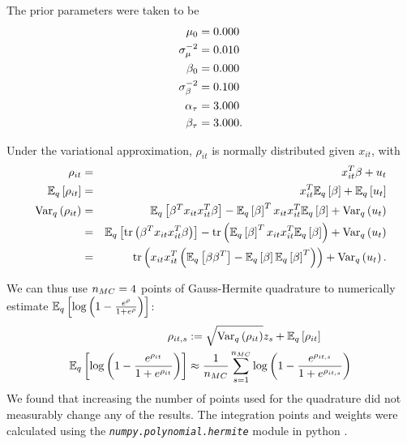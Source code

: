 \documentclass{article}\usepackage[]{graphicx}\usepackage[]{color}
\theoremstyle{plain}
\theoremstyle{definition}
\theoremstyle{plain}
\theoremstyle{plain}
\theoremstyle{plain}
\theoremstyle{plain}
\begin{document}
The prior parameters were taken to be
\begin{align*}
\mu_{0} & =0.000\\
\sigma_{\mu}^{-2} & =0.010\\
\beta_{0} & =0.000\\
\sigma_{\beta}^{-2} & =0.100\\
\alpha_{\tau} & =3.000\\
\beta_{\tau} & =3.000.
\end{align*}

Under the variational approximation, $\rho_{it}$ is normally distributed
given $x_{it}$, with 
\begin{eqnarray*}
\rho_{it} & = & x_{it}^{T}\beta+u_{t}\\
\mathbb{E}_{q}\left[\rho_{it}\right] & = & x_{it}^{T}\mathbb{E}_{q}\left[\beta\right]+\mathbb{E}_{q}\left[u_{t}\right]\\
\textrm{Var}_{q}\left(\rho_{it}\right) & = & \mathbb{E}_{q}\left[\beta^{T}x_{it}x_{it}^{T}\beta\right]-\mathbb{E}_{q}\left[\beta\right]^{T}x_{it}x_{it}^{T}\mathbb{E}_{q}\left[\beta\right]+\textrm{Var}_{q}\left(u_{t}\right)\\
 & = & \mathbb{E}_{q}\left[\textrm{tr}\left(\beta^{T}x_{it}x_{it}^{T}\beta\right)\right]-\textrm{tr}\left(\mathbb{E}_{q}\left[\beta\right]^{T}x_{it}x_{it}^{T}\mathbb{E}_{q}\left[\beta\right]\right)+\textrm{Var}_{q}\left(u_{t}\right)\\
 & = & \textrm{tr}\left(x_{it}x_{it}^{T}\left(\mathbb{E}_{q}\left[\beta\beta^{T}\right]-\mathbb{E}_{q}\left[\beta\right]\mathbb{E}_{q}\left[\beta\right]^{T}\right)\right)+\textrm{Var}_{q}\left(u_{t}\right).
\end{eqnarray*}

We can thus use $n_{MC}=4$ points of Gauss-Hermite
quadrature to numerically estimate $\mathbb{E}_{q}\left[\log\left(1-\frac{e^{\rho}}{1+e^{\rho}}\right)\right]$:
\begin{align*}
\rho_{it,s} & :=\sqrt{\textrm{Var}_{q}\left(\rho_{it}\right)}z_{s}+\mathbb{E}_{q}\left[\rho_{it}\right]\\
\mathbb{E}_{q}\left[\log\left(1-\frac{e^{\rho_{it}}}{1+e^{\rho_{it}}}\right)\right] & \approx\frac{1}{n_{MC}}\sum_{s=1}^{n_{MC}}\log\left(1-\frac{e^{\rho_{it,s}}}{1+e^{\rho_{it,s}}}\right)
\end{align*}
We found that increasing the number of points used for the quadrature
did not measurably change any of the results. The integration points
and weights were calculated using the \texttt{\textit{numpy.polynomial.hermite}}
module in python \citep{scipy}.
\end{document}
